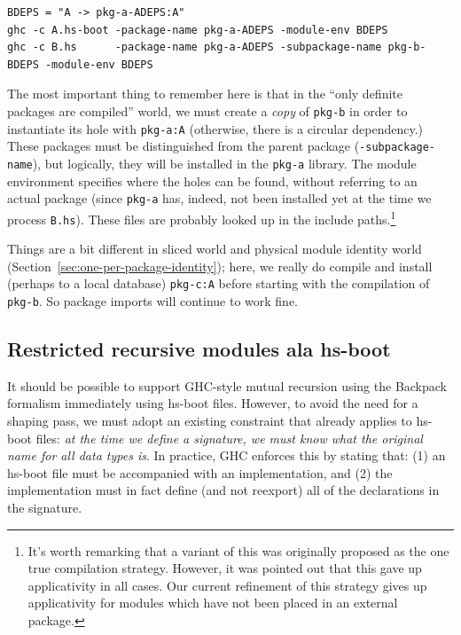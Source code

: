 \documentclass{article}
\begin{document}
\begin{verbatim}
BDEPS = "A -> pkg-a-ADEPS:A"
ghc -c A.hs-boot -package-name pkg-a-ADEPS -module-env BDEPS
ghc -c B.hs      -package-name pkg-a-ADEPS -subpackage-name pkg-b-BDEPS -module-env BDEPS
\end{verbatim}

The most important thing to remember here is that in the ``only definite
packages are compiled'' world, we must create a \emph{copy} of
\verb|pkg-b| in order to instantiate its hole with \verb|pkg-a:A|
(otherwise, there is a circular dependency.)  These packages must be
distinguished from the parent package (\verb|-subpackage-name|), but
logically, they will be installed in the \verb|pkg-a| library.  The
module environment specifies where the holes can be found, without
referring to an actual package (since \verb|pkg-a| has, indeed, not been
installed yet at the time we process \verb|B.hs|).  These files are
probably looked up in the include paths.\footnote{It's worth remarking
    that a variant of this was originally proposed as the one true
    compilation strategy.  However, it was pointed out that this gave up
    applicativity in all cases.  Our current refinement of this strategy
gives up applicativity for modules which have not been placed in an
external package.}

Things are a bit different in sliced world and physical module identity
world (Section~\ref{sec:one-per-package-identity}); here, we really do
compile and install (perhaps to a local database) \verb|pkg-c:A| before
starting with the compilation of \verb|pkg-b|.  So package imports will
continue to work fine.

\subsection{Restricted recursive modules ala hs-boot}\label{sec:hs-boot-restrict}

It should be possible to support GHC-style mutual recursion using the
Backpack formalism immediately using hs-boot files.  However, to avoid
the need for a shaping pass, we must adopt an existing constraint that
already applies to hs-boot files: \emph{at the time we define a signature,
we must know what the original name for all data types is}.  In practice,
GHC enforces this by stating that: (1) an hs-boot file must be
accompanied with an implementation, and (2) the implementation must
in fact define (and not reexport) all of the declarations in the signature.
\end{document}
